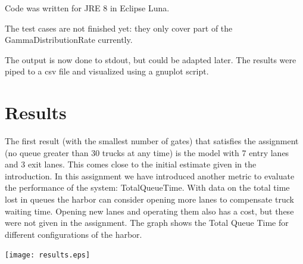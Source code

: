 \documentclass{article}
\begin{document}
Code was written for JRE 8 in Eclipse Luna.

The test cases are not finished yet: they only cover part of the
GammaDistributionRate currently.

The output is now done to stdout, but could be adapted later. The
results were piped to a csv file and visualized using a gnuplot
script.

\section{Results}

The first result (with the smallest number of gates) that satisfies
the assignment (no queue greater than 30 trucks at any time) is the
model with 7 entry lanes and 3 exit lanes. This comes close to the
initial estimate given in the introduction. In this assignment we have
introduced another metric to evaluate the performance of the system:
TotalQueueTime. With data on the total time lost in queues the harbor
can consider opening more lanes to compensate truck waiting
time. Opening new lanes and operating them also has a cost, but these
were not given in the assignment. The graph shows the Total Queue Time
for different configurations of the harbor.

\texttt{[image: results.eps]}
\end{document}
